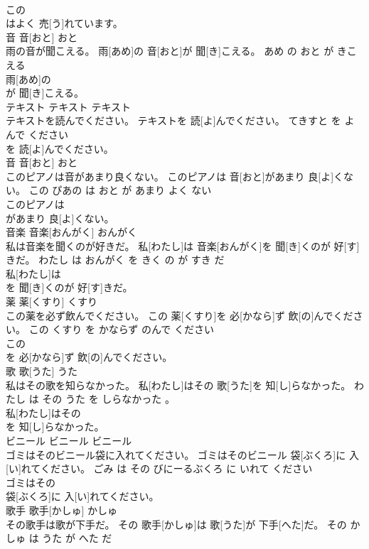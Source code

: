 \documentclass[8pt]{extreport}
\begin{document}
\begin{CJK}{UTF8}{min}
\\	この
\\	はよく 売[う]れています。			
\\	音	音[おと]	おと	
\\	雨の音が聞こえる。	雨[あめ]の 音[おと]が 聞[き]こえる。	あめ の おと が きこえる	
\\	雨[あめ]の
\\	が 聞[き]こえる。			
\\	テキスト	テキスト	テキスト	
\\	テキストを読んでください。	テキストを 読[よ]んでください。	てきすと を よんで ください	
\\	を 読[よ]んでください。			
\\	音	音[おと]	おと	
\\	このピアノは音があまり良くない。	このピアノは 音[おと]があまり 良[よ]くない。	この ぴあの は おと が あまり よく ない	
\\	このピアノは
\\	があまり 良[よ]くない。			
\\	音楽	音楽[おんがく]	おんがく	
\\	私は音楽を聞くのが好きだ。	私[わたし]は 音楽[おんがく]を 聞[き]くのが 好[す]きだ。	わたし は おんがく を きく の が すき だ	
\\	私[わたし]は
\\	を 聞[き]くのが 好[す]きだ。			
\\	薬	薬[くすり]	くすり	
\\	この薬を必ず飲んでください。	この 薬[くすり]を 必[かなら]ず 飲[の]んでください。	この くすり を かならず のんで ください	
\\	この
\\	を 必[かなら]ず 飲[の]んでください。			
\\	歌	歌[うた]	うた	
\\	私はその歌を知らなかった。	私[わたし]はその 歌[うた]を 知[し]らなかった。	わたし は その うた を しらなかった 。	
\\	私[わたし]はその
\\	を 知[し]らなかった。			
\\	ビニール	ビニール	ビニール	
\\	ゴミはそのビニール袋に入れてください。	ゴミはそのビニール 袋[ぶくろ]に 入[い]れてください。	ごみ は その びにーるぶくろ に いれて ください	
\\	ゴミはその
\\	袋[ぶくろ]に 入[い]れてください。			
\\	歌手	歌手[かしゅ]	かしゅ	
\\	その歌手は歌が下手だ。	その 歌手[かしゅ]は 歌[うた]が 下手[へた]だ。	その かしゅ は うた が へた だ	

\end{CJK}
\end{document}

